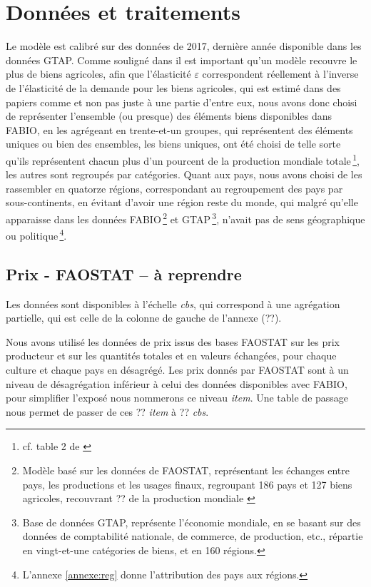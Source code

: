 \section{Données et traitements}

Le modèle est calibré sur des données de 2017, dernière année disponible dans les données GTAP. Comme souligné dans \cite{Gouel2021} il est important qu'un modèle recouvre le plus de biens agricoles, afin que l'élasticité $\varepsilon$ correspondent réellement à l'inverse de l'élasticité de la demande pour les biens agricoles, qui est estimé dans des papiers comme \cite{Comin2021} et non pas juste à une partie d'entre eux, nous avons donc choisi de représenter l'ensemble (ou presque) des éléments biens disponibles dans FABIO, en les agrégeant en trente-et-un groupes, qui représentent des éléments uniques ou bien des ensembles, les biens uniques, ont été choisi de telle sorte qu'ils représentent chacun plus d'un pourcent de la production mondiale totale\,\footnote{cf. table 2 de \cite{Gouel2021}}, les autres sont regroupés par catégories. Quant aux pays, nous avons choisi de les rassembler en quatorze régions, correspondant au regroupement des pays par sous-continents, en évitant d'avoir une région reste du monde, qui malgré qu'elle apparaisse dans les données FABIO\,\footnote{Modèle basé sur les données de FAOSTAT, représentant les échanges entre pays, les productions et les usages finaux, regroupant 186 pays et 127 biens agricoles, recouvrant ?? de la production mondiale \cite{Bruckner2019}} et GTAP\,\footnote{Base de données GTAP, représente l'économie mondiale, en se basant sur des données de comptabilité nationale, de commerce, de production, etc., répartie en vingt-et-une catégories de biens, et en 160 régions.}, n'avait pas de sens géographique ou politique\,\footnote{L'annexe \ref{annexe:reg} donne l'attribution des pays aux régions.}.


\subsection{Prix - FAOSTAT -- \textbf{à reprendre}}\label{subsec:prix}

Les données sont disponibles à l'échelle \textit{cbs}, qui correspond à une agrégation partielle, qui est celle de la colonne de gauche de l'annexe (??).

Nous avons utilisé les données de prix issus des bases FAOSTAT sur les prix producteur et sur les quantités totales et en valeurs échangées, pour chaque culture et chaque pays en désagrégé. Les prix donnés par FAOSTAT sont à un niveau de désagrégation inférieur à celui des données disponibles avec FABIO, pour simplifier l'exposé nous nommerons ce niveau \textit{item}. Une table de passage nous permet de passer de ces ?? \textit{item} à ?? \textit{cbs}.

